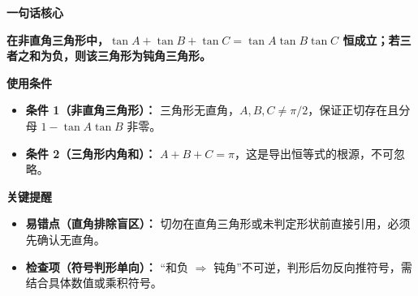 \begin{summarybox}
\textbf{\textcolor{CSummary}{一句话核心}}

\textbf{在非直角三角形中，$\tan A+\tan B+\tan C = \tan A\tan B\tan C$ 恒成立；若三者之和为负，则该三角形为钝角三角形。}

\medskip
\textbf{\textcolor{CSummary}{使用条件}}
\begin{itemize}[leftmargin=*, itemsep=0.5em, topsep=0.4em]
    \item \textbf{条件 1（非直角三角形）：} 三角形无直角，$A,B,C \neq \pi/2$，保证正切存在且分母 $1-\tan A\tan B$ 非零。
    \item \textbf{条件 2（三角形内角和）：} $A+B+C=\pi$，这是导出恒等式的根源，不可忽略。
\end{itemize}

\medskip
\textbf{\textcolor{CSummary}{关键提醒}}
\begin{itemize}[leftmargin=*, itemsep=0.5em, topsep=0.4em]
    \item \textbf{易错点（直角排除盲区）：} 切勿在直角三角形或未判定形状前直接引用，必须先确认无直角。
    \item \textbf{检查项（符号判形单向）：} “和负 $\Rightarrow$ 钝角”不可逆，判形后勿反向推符号，需结合具体数值或乘积符号。
\end{itemize}
\end{summarybox}
